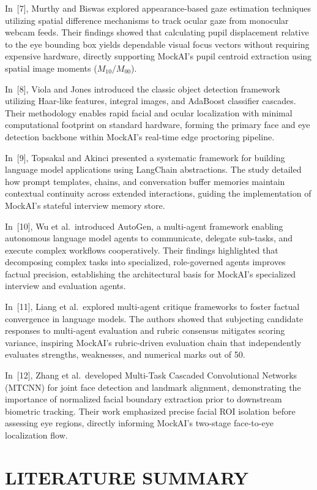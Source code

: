 \documentclass[12pt,a4paper]{report}
\begin{document}
In~[7], Murthy and Biswas explored appearance-based gaze estimation techniques utilizing
spatial difference mechanisms to track ocular gaze from monocular webcam feeds. Their
findings showed that calculating pupil displacement relative to the eye bounding box
yields dependable visual focus vectors without requiring expensive hardware, directly
supporting MockAI's pupil centroid extraction using spatial image moments
($M_{10} / M_{00}$).

In~[8], Viola and Jones introduced the classic object detection framework utilizing
Haar-like features, integral images, and AdaBoost classifier cascades. Their methodology
enables rapid facial and ocular localization with minimal computational footprint on
standard hardware, forming the primary face and eye detection backbone within MockAI's
real-time edge proctoring pipeline.

In~[9], Topsakal and Akinci presented a systematic framework for building language model
applications using LangChain abstractions. The study detailed how prompt templates,
chains, and conversation buffer memories maintain contextual continuity across extended
interactions, guiding the implementation of MockAI's stateful interview memory store.

In~[10], Wu et al.\ introduced AutoGen, a multi-agent framework enabling autonomous
language model agents to communicate, delegate sub-tasks, and execute complex workflows
cooperatively. Their findings highlighted that decomposing complex tasks into specialized,
role-governed agents improves factual precision, establishing the architectural basis for
MockAI's specialized interview and evaluation agents.

In~[11], Liang et al.\ explored multi-agent critique frameworks to foster factual convergence
in language models. The authors showed that subjecting candidate responses to multi-agent
evaluation and rubric consensus mitigates scoring variance, inspiring MockAI's
rubric-driven evaluation chain that independently evaluates strengths, weaknesses, and
numerical marks out of 50.

In~[12], Zhang et al.\ developed Multi-Task Cascaded Convolutional Networks (MTCNN)
for joint face detection and landmark alignment, demonstrating the importance of
normalized facial boundary extraction prior to downstream biometric tracking. Their work
emphasized precise facial ROI isolation before assessing eye regions, directly informing
MockAI's two-stage face-to-eye localization flow.

\section{LITERATURE SUMMARY}
\end{document}
